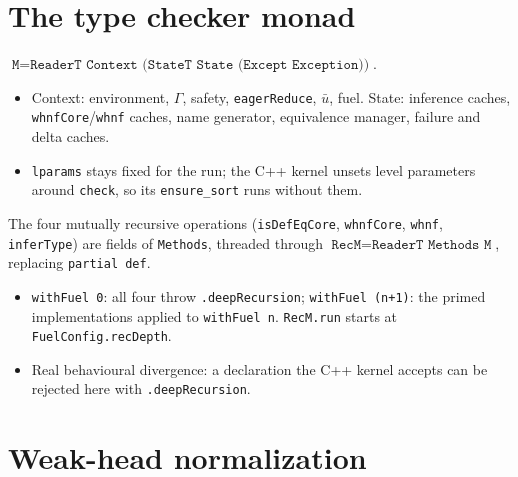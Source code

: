 \section{The type checker monad}

\begin{definition}
\label{structure:kernel-tc-monad}
\leanok
{}
 $\texttt{M} = \texttt{ReaderT Context (StateT State (Except Exception))}$.
\begin{itemize}
\item Context: environment, $\Gamma$, safety, \texttt{eagerReduce}, $\bar u$, fuel. State:
inference caches, \texttt{whnfCore}/\texttt{whnf} caches, name generator, equivalence manager,
failure and delta caches.
\item {} \texttt{lparams} stays fixed for the run; the C++ kernel unsets level
parameters around \texttt{check}, so its \texttt{ensure\_sort} runs without them.
\end{itemize}
\end{definition}

\begin{definition}
\label{structure:kernel-methods-fuel}
\leanok
{}
 The four mutually recursive operations (\texttt{isDefEqCore}, \texttt{whnfCore},
\texttt{whnf}, \texttt{inferType}) are fields of \texttt{Methods}, threaded through
$\texttt{RecM} = \texttt{ReaderT Methods M}$, replacing \texttt{partial def}.
\begin{itemize}
\item \texttt{withFuel 0}: all four throw \texttt{.deepRecursion}; \texttt{withFuel (n+1)}: the
primed implementations applied to \texttt{withFuel n}. \texttt{RecM.run} starts at
\texttt{FuelConfig.recDepth}.
\item {} Real behavioural divergence: a declaration the C++ kernel accepts can be
rejected here with \texttt{.deepRecursion}.
\end{itemize}
\end{definition}

\section{Weak-head normalization}

